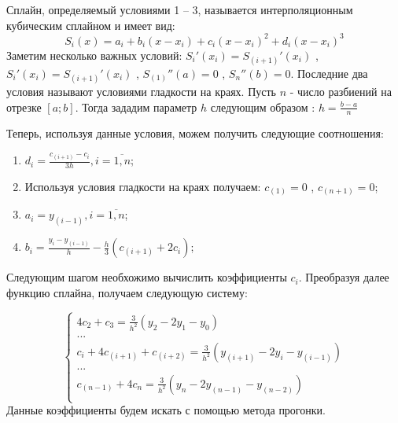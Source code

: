 \documentclass [12pt]{article}
\begin{document}
Сплайн, определяемый условиями 1 – 3, называется интерполяционным кубическим сплайном и имеет вид:
$$S_i(x) = a_i + b_i(x - x_i) + c_i(x - x_i)^2 + d_i(x - x_i)^3$$
Заметим несколько важных условий: $S_i'(x_i) = S_(i+1)'(x_i)$ , $S_i'(x_i) = S_(i+1)'(x_i)$ , $S_(1)''(a) = 0$ , $S_n''(b) = 0$. Последние два условия называют условиями гладкости на краях.
Пусть $n$ - число разбиений на отрезке $[a;b]$. Тогда зададим параметр $h$ следующим образом : $h = \frac{b - a}{n}$

Теперь, используя данные условия, можем получить следующие соотношения:
\begin{enumerate}
\item $d_i = \frac{c_(i+1) - c_i}{3h} , i = \overline{1,n}$;
\item Используя условия гладкости на краях получаем: $c_(1) = 0$ , $c_(n+1) = 0$;
\item $a_i = y_(i-1) , i = \overline{1,n}$;
\item $b_i = \frac{y_i - y_(i-1)}{h} - \frac{h}{3}(c_(i+1) + 2c_i)$;
\end{enumerate}
Следующим шагом необхожимо вычислить коэффициенты $c_i$. Преобразуя далее функцию сплайна, получаем следующую систему:

\begin{equation*}
\begin{cases}
4c_2 + c_3 = \frac{3}{h^2}(y_2 - 2y_1 - y_0) \\
... \\
c_i + 4c_(i+1) + c_(i+2) = \frac{3}{h^2}(y_(i+1) - 2y_i - y_(i-1)) \\
... \\
c_(n-1) + 4c_n = \frac{3}{h^2}(y_n - 2y_(n-1) - y_(n-2)) \\
\end{cases}
\end{equation*}
Данные коэффициенты будем искать с помощью метода прогонки.
\end{document}
